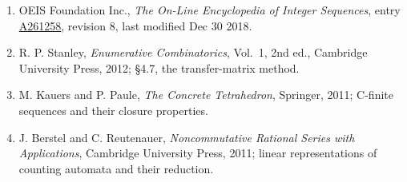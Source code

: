 \documentclass[11pt]{article}
\theoremstyle{definition}
\begin{document}
\begin{enumerate}

\item OEIS Foundation Inc., \emph{The On-Line Encyclopedia of Integer Sequences}, entry \href{https://oeis.org/A261258}{A261258}, revision 8, last modified Dec 30 2018.

\item R. P. Stanley, \emph{Enumerative Combinatorics}, Vol.~1, 2nd ed., Cambridge University Press, 2012; \S4.7, the transfer-matrix method.

\item M. Kauers and P. Paule, \emph{The Concrete Tetrahedron}, Springer, 2011; C-finite sequences and their closure properties.

\item J. Berstel and C. Reutenauer, \emph{Noncommutative Rational Series with Applications}, Cambridge University Press, 2011; linear representations of counting automata and their reduction.

\end{enumerate}
\end{document}
